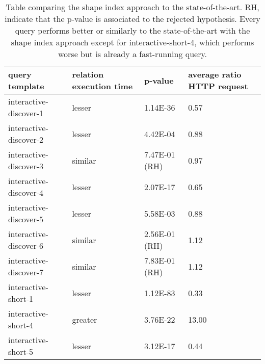 \begin{table}
	\begin{center}
		\begin{tabular}{|l|l|l|l|}
			\hline
			query template & relation execution time & p-value & average ratio HTTP request \\
			\hline
			interactive-discover-1 & lesser & 1.14E-36 & 0.57 \\
			\hline
			interactive-discover-2 & lesser & 4.42E-04 & 0.88 \\
			\hline
			interactive-discover-3 & similar & 7.47E-01 (RH) & 0.97 \\
			\hline
			interactive-discover-4 & lesser & 2.07E-17 & 0.65 \\
			\hline
			interactive-discover-5 & lesser & 5.58E-03 & 0.88 \\
			\hline
			interactive-discover-6 & similar & 2.56E-01 (RH) & 1.12 \\
			\hline
			interactive-discover-7 & similar & 7.83E-01 (RH) & 1.12 \\
			\hline
			interactive-short-1 & lesser & 1.12E-83 & 0.33 \\
			\hline
			interactive-short-4 & greater & 3.76E-22 & 13.00 \\
			\hline
			interactive-short-5 & lesser & 3.12E-17 & 0.44 \\
			\hline
		\end{tabular}
	\end{center}
	\caption{Table comparing the shape index approach to the state-of-the-art. RH, indicate that the p-value is associated to the rejected hypothesis. Every query performs better or similarly to the state-of-the-art with the shape index approach except for interactive-short-4, which performs worse but is already a fast-running query.}
	\label{tab:statSignificanceStateOfTheArt}
\end{table}